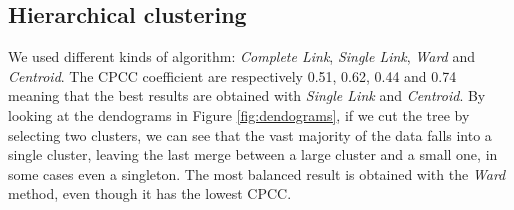 \subsection{Hierarchical clustering}
We used different kinds of algorithm: \emph{Complete Link}, \emph{Single Link}, \emph{Ward} and \emph{Centroid}. The CPCC coefficient are respectively 0.51, 0.62, 0.44 and 0.74 meaning that the best results are obtained with \emph{Single Link} and \emph{Centroid}. By looking at the dendograms in Figure \ref{fig:dendograms}, if we cut the tree by selecting two clusters, we can see that the vast majority of the data falls into a single cluster, leaving the last merge between a large cluster and a small one, in some cases even a singleton. The most balanced result is obtained with the \emph{Ward} method, even though it has the lowest CPCC.

